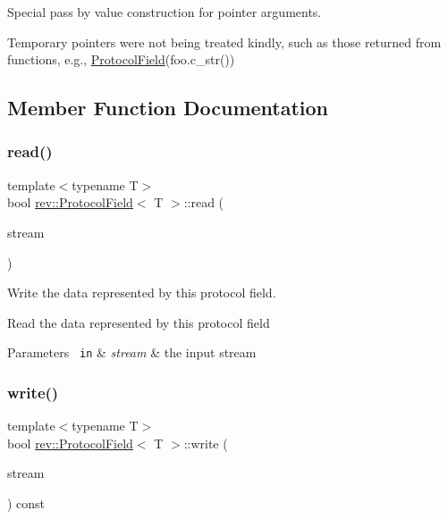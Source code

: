 Special pass by value construction for pointer arguments. 

Temporary pointers were not being treated kindly, such as those returned from functions, e.\+g., \mbox{\hyperlink{structrev_1_1_protocol_field}{Protocol\+Field}}(foo.\+c\+\_\+str()) 

\subsection{Member Function Documentation}
\mbox{\label{structrev_1_1_protocol_field_adce4cb535c5fcd3aaeac1c0c0f5fda71}} 
\subsubsection{\texorpdfstring{read()}{read()}}
{\footnotesize\ttfamily template$<$typename T$>$ \\
bool \mbox{\hyperlink{structrev_1_1_protocol_field}{rev\+::\+Protocol\+Field}}$<$ T $>$\+::read (\begin{DoxyParamCaption}\item[{const \mbox{\hyperlink{classrev_1_1_file_stream}{File\+Stream}} \&}]{stream }\end{DoxyParamCaption})\hspace{0.3cm}{\ttfamily [inline]}}



Write the data represented by this protocol field. 

Read the data represented by this protocol field 
\begin{DoxyParams}[1]{Parameters}
\mbox{\texttt{ in}}  & {\em stream} & the input stream \\
\hline
\end{DoxyParams}
\mbox{\label{structrev_1_1_protocol_field_a39549ff49ab211a50e5f6a9cc61ecfa0}} 
\subsubsection{\texorpdfstring{write()}{write()}}
{\footnotesize\ttfamily template$<$typename T$>$ \\
bool \mbox{\hyperlink{structrev_1_1_protocol_field}{rev\+::\+Protocol\+Field}}$<$ T $>$\+::write (\begin{DoxyParamCaption}\item[{const \mbox{\hyperlink{classrev_1_1_file_stream}{File\+Stream}} \&}]{stream }\end{DoxyParamCaption}) const\hspace{0.3cm}{\ttfamily [inline]}}



